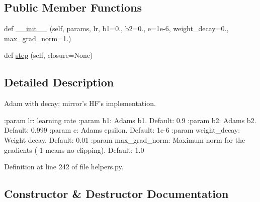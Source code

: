 \subsection*{Public Member Functions}
\begin{DoxyCompactItemize}
\item 
def \hyperlink{classparlai_1_1agents_1_1bert__ranker_1_1helpers_1_1AdamWithDecay_a341310a9a32859bdbdf4ca8bce7bb239}{\+\_\+\+\_\+init\+\_\+\+\_\+} (self, params, lr, b1=0., b2=0., e=1e-\/6, weight\+\_\+decay=0., max\+\_\+grad\+\_\+norm=1.)
\item 
def \hyperlink{classparlai_1_1agents_1_1bert__ranker_1_1helpers_1_1AdamWithDecay_aeb41188377c1a61b4638228abd6c3e64}{step} (self, closure=None)
\end{DoxyCompactItemize}


\subsection{Detailed Description}
\begin{DoxyVerb}Adam with decay; mirror's HF's implementation.

:param lr:
    learning rate
:param b1:
    Adams b1. Default: 0.9
:param b2:
    Adams b2. Default: 0.999
:param e:
    Adams epsilon. Default: 1e-6
:param weight_decay:
    Weight decay. Default: 0.01
:param max_grad_norm:
    Maximum norm for the gradients (-1 means no clipping).  Default: 1.0
\end{DoxyVerb}
 

Definition at line 242 of file helpers.\+py.



\subsection{Constructor \& Destructor Documentation}
\mbox{\label{classparlai_1_1agents_1_1bert__ranker_1_1helpers_1_1AdamWithDecay_a341310a9a32859bdbdf4ca8bce7bb239}} 
